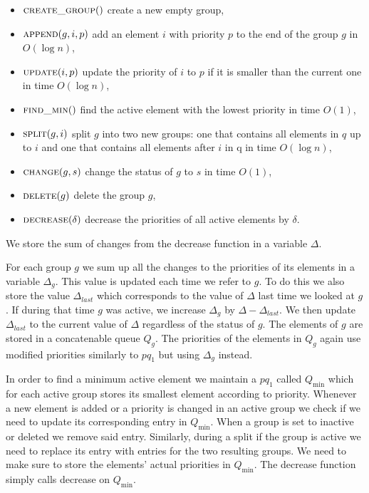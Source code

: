 \begin{itemize}
    \item $\textsc{create\_group}()$ create a new empty group,
    \item $\textsc{append}(g, i, p)$ add an element $i$ with priority $p$ to the end of the group $g$ in $O(\log n)$,
    \item $\textsc{update}(i, p)$ update the priority of $i$ to $p$ if it is smaller than the current one in time $O(\log n)$,
    \item $\textsc{find\_min}()$ find the active element with the lowest priority in time $O(1)$,
    \item $\textsc{split}(g, i)$ split $g$ into two new groups: one that contains all elements in $q$ up to $i$ and one that contains all elements after $i$ in q in time $O(\log n)$,
    \item $\textsc{change}(g, s)$ change the status of $g$ to $s$ in time $O(1)$,
    \item $\textsc{delete}(g)$ delete the group $g$,
    \item $\textsc{decrease}(\delta)$ decrease the priorities of all active elements by $\delta$.
\end{itemize}

We store the sum of changes from the decrease function in a variable $\Delta$.

For each group $g$ we sum up all the changes to the priorities of its elements in a variable $\Delta_g$. This value is updated each time we refer to $g$. To do this we also store the value $\Delta_{last}$ which corresponds to the value of $\Delta$ last time we looked at $g$. If during that time $g$ was active, we increase $\Delta_g$ by $\Delta - \Delta_{last}$. We then update $\Delta_{last}$ to the current value of $\Delta$ regardless of the status of $g$. The elements of $g$ are stored in a concatenable queue $Q_g$. The priorities of the elements in $Q_g$ again use modified priorities similarly to $pq_1$ but using $\Delta_g$ instead. 

In order to find a minimum active element we maintain a $pq_1$ called $Q_{\min}$ which for each active group stores its smallest element according to priority. Whenever a new element is added or a priority is changed in an active group we check if we need to update its corresponding entry in $Q_{\min}$. When a group is set to inactive or deleted we remove said entry. Similarly, during a split if the group is active we need to replace its entry with entries for the two resulting groups. We need to make sure to store the elements' actual priorities in $Q_{\min}$. The decrease function simply calls decrease on $Q_{\min}$.

